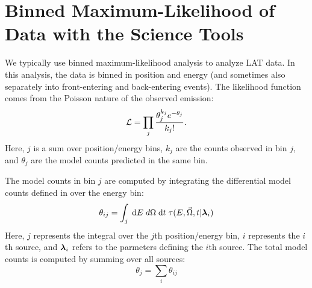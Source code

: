 \section{Binned Maximum-Likelihood of  Data with the Science Tools}

We typically use binned maximum-likelihood analysis to analyze \ac{LAT}
data.  In this analysis, the data is binned in position and energy (and
sometimes also separately into front-entering and back-entering events).
The likelihood function comes from the Poisson nature of the observed
emission:
\begin{equation}
  \mathcal{L}=\prod_j \frac{\theta_j^{k_j} e^{-\theta_j}}{k_j!}.
\end{equation}
Here, $j$ is a sum over position/energy bins,
$k_j$ are the counts observed in bin $j$, and 
$\theta_j$ are the model counts predicted in the same bin.


The model counts in bin $j$ are computed by integrating the differential
model counts defined in  over the energy bin:
  \begin{equation}
    \theta_{ij} = \int_j \; \text{d}E \; 
    d\Omega \; \text{d}t \; 
    \tau(E,\vec\Omega,t|\boldsymbol{\lambda}_i)
  \end{equation}
Here, $j$ represents the integral over the $j$th position/energy bin,
$i$ represents the $i$th source, and $\boldsymbol{\lambda}_i$ refers to the
parmeters defining the $i$th source. The total model counts
is computed by summing over all sources:
\begin{equation}
  \theta_j = \sum_i \theta_{ij}
\end{equation}




